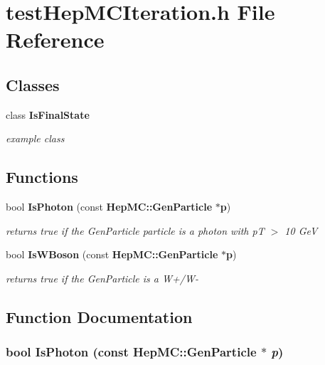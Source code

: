 \section{test\-Hep\-MCIteration.h File Reference}
\label{testHepMCIteration_8h}
\subsection*{Classes}
\begin{CompactItemize}
\item 
class {\bf Is\-Final\-State}
\begin{CompactList}\small\item\em example class \item\end{CompactList}\end{CompactItemize}
\subsection*{Functions}
\begin{CompactItemize}
\item 
bool {\bf Is\-Photon} (const {\bf Hep\-MC::Gen\-Particle} $\ast${\bf p})
\begin{CompactList}\small\item\em returns true if the Gen\-Particle particle is a photon with p\-T $>$ 10 Ge\-V \item\end{CompactList}\item 
bool {\bf Is\-WBoson} (const {\bf Hep\-MC::Gen\-Particle} $\ast${\bf p})
\begin{CompactList}\small\item\em returns true if the Gen\-Particle is a W+/W- \item\end{CompactList}\end{CompactItemize}


\subsection{Function Documentation}
\subsubsection{\setlength{\rightskip}{0pt plus 5cm}bool {\bf Is\-Photon} (const {\bf Hep\-MC::Gen\-Particle} $\ast$ {\em p})}\label{testHepMCIteration_8h_11622331510bbca7d7d70dba900b3ad8}


